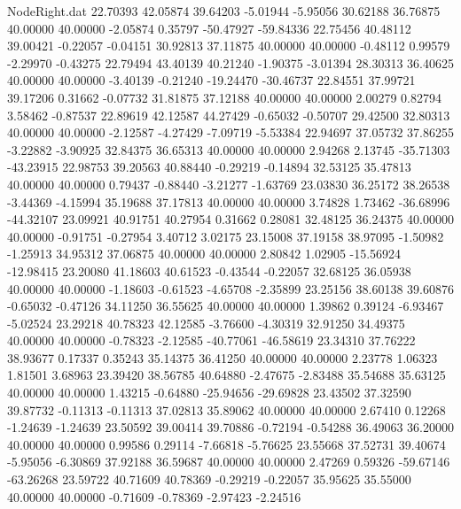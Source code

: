 \begin{filecontents}{NodeRight.dat}
  22.70393   42.05874   39.64203    -5.01944   -5.95056   30.62188   36.76875   40.00000   40.00000   -2.05874    0.35797  -50.47927  -59.84336
  22.75456   40.48112   39.00421    -0.22057   -0.04151   30.92813   37.11875   40.00000   40.00000   -0.48112    0.99579   -2.29970   -0.43275
  22.79494   43.40139   40.21240    -1.90375   -3.01394   28.30313   36.40625   40.00000   40.00000   -3.40139   -0.21240  -19.24470  -30.46737
  22.84551   37.99721   39.17206     0.31662   -0.07732   31.81875   37.12188   40.00000   40.00000    2.00279    0.82794    3.58462   -0.87537
  22.89619   42.12587   44.27429    -0.65032   -0.50707   29.42500   32.80313   40.00000   40.00000   -2.12587   -4.27429   -7.09719   -5.53384
  22.94697   37.05732   37.86255    -3.22882   -3.90925   32.84375   36.65313   40.00000   40.00000    2.94268    2.13745  -35.71303  -43.23915
  22.98753   39.20563   40.88440    -0.29219   -0.14894   32.53125   35.47813   40.00000   40.00000    0.79437   -0.88440   -3.21277   -1.63769
  23.03830   36.25172   38.26538    -3.44369   -4.15994   35.19688   37.17813   40.00000   40.00000    3.74828    1.73462  -36.68996  -44.32107
  23.09921   40.91751   40.27954     0.31662    0.28081   32.48125   36.24375   40.00000   40.00000   -0.91751   -0.27954    3.40712    3.02175
  23.15008   37.19158   38.97095    -1.50982   -1.25913   34.95312   37.06875   40.00000   40.00000    2.80842    1.02905  -15.56924  -12.98415
  23.20080   41.18603   40.61523    -0.43544   -0.22057   32.68125   36.05938   40.00000   40.00000   -1.18603   -0.61523   -4.65708   -2.35899
  23.25156   38.60138   39.60876    -0.65032   -0.47126   34.11250   36.55625   40.00000   40.00000    1.39862    0.39124   -6.93467   -5.02524
  23.29218   40.78323   42.12585    -3.76600   -4.30319   32.91250   34.49375   40.00000   40.00000   -0.78323   -2.12585  -40.77061  -46.58619
  23.34310   37.76222   38.93677     0.17337    0.35243   35.14375   36.41250   40.00000   40.00000    2.23778    1.06323    1.81501    3.68963
  23.39420   38.56785   40.64880    -2.47675   -2.83488   35.54688   35.63125   40.00000   40.00000    1.43215   -0.64880  -25.94656  -29.69828
  23.43502   37.32590   39.87732    -0.11313   -0.11313   37.02813   35.89062   40.00000   40.00000    2.67410    0.12268   -1.24639   -1.24639
  23.50592   39.00414   39.70886    -0.72194   -0.54288   36.49063   36.20000   40.00000   40.00000    0.99586    0.29114   -7.66818   -5.76625
  23.55668   37.52731   39.40674    -5.95056   -6.30869   37.92188   36.59687   40.00000   40.00000    2.47269    0.59326  -59.67146  -63.26268
  23.59722   40.71609   40.78369    -0.29219   -0.22057   35.95625   35.55000   40.00000   40.00000   -0.71609   -0.78369   -2.97423   -2.24516

\end{filecontents}
